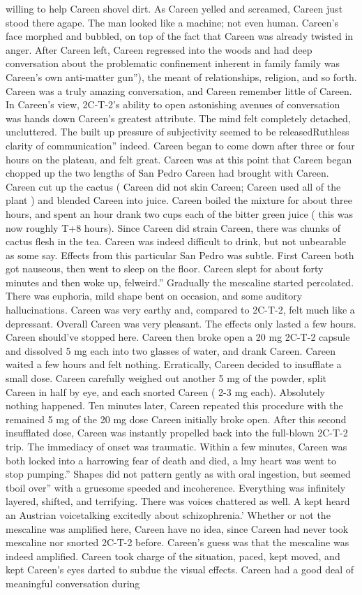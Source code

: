 \documentclass[12pt]{book}
\begin{document}
willing to help Careen shovel dirt. As Careen yelled and screamed, Careen just stood there agape. The man looked like a machine; not even human. Careen's face morphed and bubbled, on top of the fact that Careen was already twisted in anger. After Careen left, Careen regressed into the woods and had deep conversation about the problematic confinement inherent in family family was Careen's own anti-matter gun''), the meant of relationships, religion, and so forth. Careen was a truly amazing conversation, and Careen remember little of Careen. In Careen's view, 2C-T-2's ability to open astonishing avenues of conversation was hands down Careen's greatest attribute. The mind felt completely detached, uncluttered. The built up pressure of subjectivity seemed to be releasedRuthless clarity of communication'' indeed. Careen began to come down after three or four hours on the plateau, and felt great. Careen was at this point that Careen began chopped up the two lengths of San Pedro Careen had brought with Careen. Careen cut up the cactus ( Careen did not skin Careen; Careen used all of the plant ) and blended Careen into juice. Careen boiled the mixture for about three hours, and spent an hour drank two cups each of the bitter green juice ( this was now roughly T+8 hours). Since Careen did strain Careen, there was chunks of cactus flesh in the tea. Careen was indeed difficult to drink, but not unbearable as some say. Effects from this particular San Pedro was subtle. First Careen both got nauseous, then went to sleep on the floor. Careen slept for about forty minutes and then woke up, felweird.'' Gradually the mescaline started percolated. There was euphoria, mild shape bent on occasion, and some auditory hallucinations. Careen was very earthy and, compared to 2C-T-2, felt much like a depressant. Overall Careen was very pleasant. The effects only lasted a few hours. Careen should've stopped here. Careen then broke open a 20 mg 2C-T-2 capsule and dissolved 5 mg each into two glasses of water, and drank Careen. Careen waited a few hours and felt nothing. Erratically, Careen decided to insufflate a small dose. Careen carefully weighed out another 5 mg of the powder, split Careen in half by eye, and each snorted Careen ( 2-3 mg each). Absolutely nothing happened. Ten minutes later, Careen repeated this procedure with the remained 5 mg of the 20 mg dose Careen initially broke open. After this second insufflated dose, Careen was instantly propelled back into the full-blown 2C-T-2 trip. The immediacy of onset was traumatic. Within a few minutes, Careen was both locked into a harrowing fear of death and died, a lmy heart was went to stop pumping.'' Shapes did not pattern gently as with oral ingestion, but seemed tboil over'' with a gruesome speeded and incoherence. Everything was infinitely layered, shifted, and terrifying. There was voices chattered as well. A kept heard an Austrian voicetalking excitedly about schizophrenia.' Whether or not the mescaline was amplified here, Careen have no idea, since Careen had never took mescaline nor snorted 2C-T-2 before. Careen's guess was that the mescaline was indeed amplified. Careen took charge of the situation, paced, kept moved, and kept Careen's eyes darted to subdue the visual effects. Careen had a good deal of meaningful conversation during 
\end{document}

